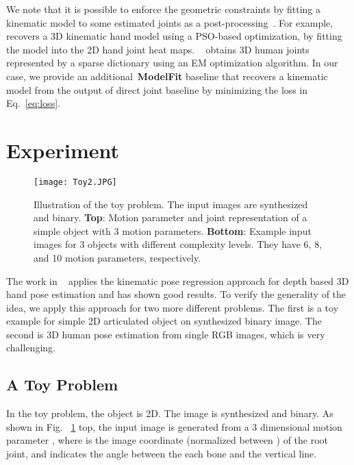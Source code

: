 \documentclass[runningheads]{llncs}
\begin{document}
We note that it is possible to enforce the geometric constraints by fitting a kinematic model to some estimated joints as a post-processing~\cite{tompson14tog,Zhou_2016_CVPR}. For example, ~\cite{tompson14tog} recovers a 3D kinematic hand model using a PSO-based optimization, by fitting the model into the 2D hand joint heat maps. ~\cite{Zhou_2016_CVPR} obtains 3D human joints represented by a sparse dictionary using an EM optimization algorithm. In our case, we provide an additional~\textbf{ModelFit} baseline that recovers a kinematic model from the output of direct joint baseline by minimizing the loss in Eq.~\ref{eq:loss}.


\section{Experiment}

\begin{figure}
\begin{center}
\texttt{[image: Toy2.JPG]}
\end{center}
   \caption{Illustration of the toy problem. The input images are synthesized and binary. \textbf{Top}: Motion parameter and joint representation of a simple object with 3 motion parameters. \textbf{Bottom}: Example input images for 3 objects with different complexity levels. They have 6, 8, and 10 motion parameters, respectively.}
\label{fig:toy}
\end{figure}

The work in ~\cite{zhou2016model} applies the kinematic pose regression approach for depth based 3D hand pose estimation and has shown good results. To verify the generality of the idea, we apply this approach for two more different problems. The first is a toy example for simple 2D articulated object on synthesized binary image. The second is 3D human pose estimation from single RGB images, which is very challenging.

\subsection{A Toy Problem}



In the toy problem, the object is 2D. The image is synthesized and binary. As shown in Fig. ~\ref{fig:toy} top, the input image is generated from a 3 dimensional motion parameter , where  is the image coordinate (normalized between ) of the root joint, and  indicates the angle between the each bone and the vertical line.
\end{document}
